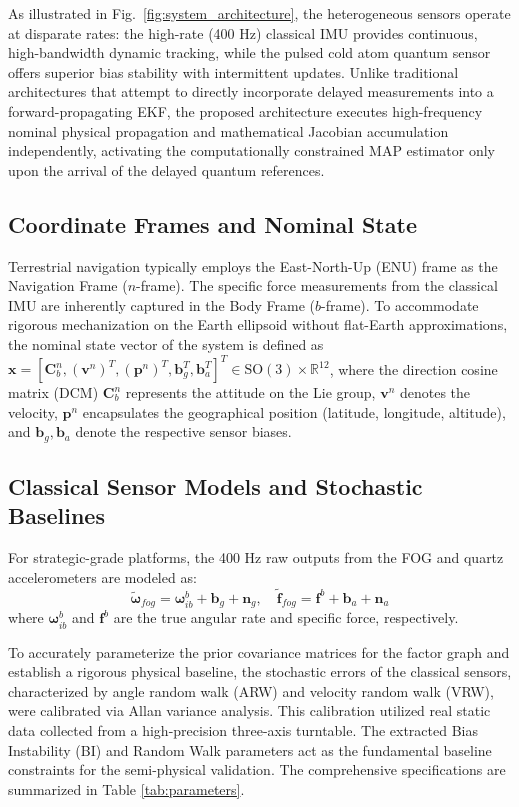 \documentclass[journal]{IEEEtran}
\newcommand{\SO}{\mathrm{SO}}
\newcommand{\R}{\mathbb{R}}
\begin{document}
	As illustrated in Fig.~\ref{fig:system_architecture}, the heterogeneous sensors operate at disparate rates: the high-rate (400 Hz) classical IMU provides continuous, high-bandwidth dynamic tracking, while the pulsed cold atom quantum sensor offers superior bias stability with intermittent updates. Unlike traditional architectures that attempt to directly incorporate delayed measurements into a forward-propagating EKF, the proposed architecture executes high-frequency nominal physical propagation and mathematical Jacobian accumulation independently, activating the computationally constrained MAP estimator only upon the arrival of the delayed quantum references.
	
	\subsection{Coordinate Frames and Nominal State}
	Terrestrial navigation typically employs the East-North-Up (ENU) frame as the Navigation Frame ($n$-frame). The specific force measurements from the classical IMU are inherently captured in the Body Frame ($b$-frame). To accommodate rigorous mechanization on the Earth ellipsoid without flat-Earth approximations, the nominal state vector of the system is defined as $\bm{x} = \left[ \bm{C}_b^n, (\bm{v}^n)^T, (\bm{p}^n)^T, \bm{b}_g^T, \bm{b}_a^T \right]^T \in \SO(3) \times \R^{12}$, where the direction cosine matrix (DCM) $\bm{C}_b^n$ represents the attitude on the Lie group, $\bm{v}^n$ denotes the velocity, $\bm{p}^n$ encapsulates the geographical position (latitude, longitude, altitude), and $\bm{b}_g, \bm{b}_a$ denote the respective sensor biases.
	
	\subsection{Classical Sensor Models and Stochastic Baselines}
	
	For strategic-grade platforms, the 400 Hz raw outputs from the FOG and quartz accelerometers are modeled as:
	\begin{equation}
		\tilde{\bm{\omega}}_{fog} = \bm{\omega}_{ib}^b + \bm{b}_g + \bm{n}_g, \quad \tilde{\bm{f}}_{fog} = \bm{f}^b + \bm{b}_a + \bm{n}_a
	\end{equation}
	where $\bm{\omega}_{ib}^b$ and $\bm{f}^b$ are the true angular rate and specific force, respectively. 
	
	To accurately parameterize the prior covariance matrices for the factor graph and establish a rigorous physical baseline, the stochastic errors of the classical sensors, characterized by angle random walk (ARW) and velocity random walk (VRW), were calibrated via Allan variance analysis. This calibration utilized real static data collected from a high-precision three-axis turntable. The extracted Bias Instability (BI) and Random Walk parameters act as the fundamental baseline constraints for the semi-physical validation. The comprehensive specifications are summarized in Table \ref{tab:parameters}.
	
\end{document}
